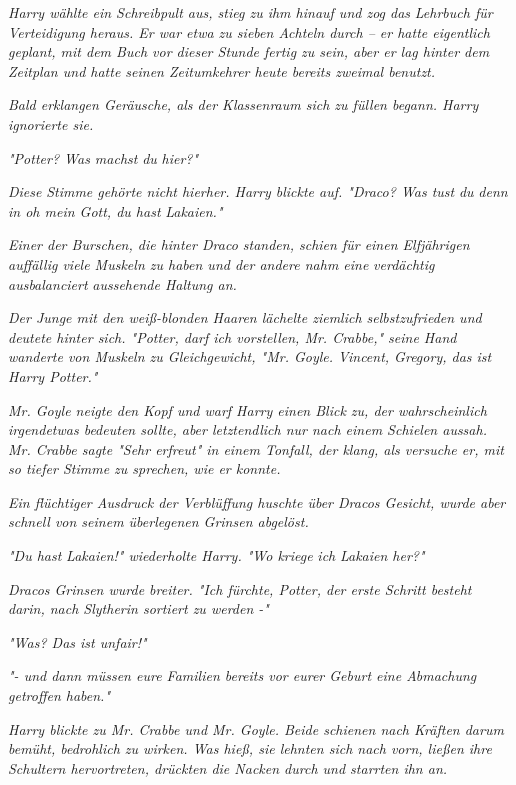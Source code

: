 {\emph{Harry wählte ein Schreibpult aus, stieg zu ihm hinauf und zog das} \emph{Lehrbuch für Verteidigung heraus. Er war etwa zu sieben Achteln durch -- er hatte eigentlich geplant, mit dem Buch vor dieser Stunde fertig zu sein, aber er lag hinter dem Zeitplan und hatte seinen Zeitumkehrer heute bereits zweimal benutzt.}

\emph{Bald erklangen Geräusche, als der Klassenraum sich zu füllen begann. Harry ignorierte sie.}

\emph{"Potter? Was machst} \emph{\emph{du}} \emph{hier?"}

\emph{\emph{Diese}} \emph{Stimme gehörte nicht hierher. Harry blickte auf. "Draco? Was tust} \emph{\emph{du}} \emph{denn in oh mein Gott, du hast} \emph{\emph{Lakaien.}"}

\emph{Einer der Burschen, die hinter Draco standen, schien für einen Elfjährigen auffällig viele Muskeln zu haben und der andere nahm eine} \emph{verdächtig ausbalanciert} \emph{aussehende Haltung an.}

\emph{Der Junge mit den weiß-blonden Haaren lächelte ziemlich selbstzufrieden und deutete hinter sich. "Potter, darf ich vorstellen, Mr. Crabbe," seine Hand wanderte von Muskeln zu Gleichgewicht, "Mr. Goyle. Vincent, Gregory, das ist Harry Potter."}

\emph{Mr. Goyle neigte den Kopf und warf Harry einen Blick zu, der wahrscheinlich irgendetwas bedeuten sollte, aber letztendlich nur nach einem Schielen aussah. Mr. Crabbe sagte "Sehr erfreut" in einem Tonfall, der klang, als versuche er, mit so tiefer Stimme zu sprechen, wie er konnte.}

\emph{Ein flüchtiger Ausdruck der Verblüffung huschte über Dracos Gesicht, wurde aber schnell von seinem überlegenen Grinsen abgelöst.}

\emph{"Du hast} \emph{\emph{Lakaien!}" wiederholte Harry. "Wo kriege} \emph{\emph{ich}} \emph{Lakaien her?"}

\emph{Dracos Grinsen wurde breiter. "Ich fürchte, Potter, der erste Schritt besteht darin, nach Slytherin sortiert zu werden -"}

\emph{"Was? Das ist unfair!"}

\emph{"- und dann müssen eure Familien bereits vor eurer Geburt eine Abmachung getroffen haben."}

\emph{Harry blickte zu Mr. Crabbe und Mr. Goyle. Beide schienen nach Kräften darum bemüht, bedrohlich zu wirken. Was hieß, sie lehnten sich nach vorn, ließen ihre Schultern hervortreten, drückten die Nacken durch und starrten ihn an.}

}

